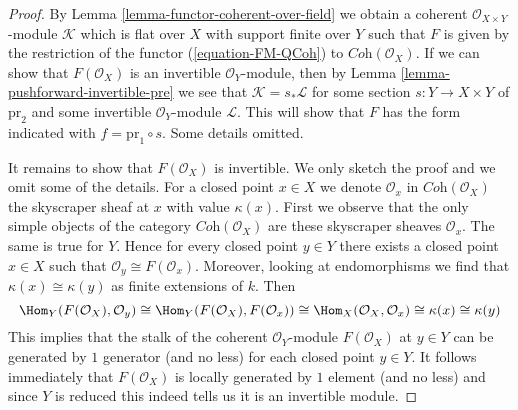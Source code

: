 \begin{proof}
By Lemma \ref{lemma-functor-coherent-over-field} we obtain a coherent
$\mathcal{O}_{X \times Y}$-module $\mathcal{K}$ which is flat
over $X$ with support finite over $Y$ such that $F$ is given by
the restriction of the functor
(\ref{equation-FM-QCoh}) to $\textit{Coh}(\mathcal{O}_X)$.
If we can show that $F(\mathcal{O}_X)$ is an invertible $\mathcal{O}_Y$-module,
then by Lemma \ref{lemma-pushforward-invertible-pre}
we see that $\mathcal{K} = s_*\mathcal{L}$
for some section $s : Y \to X \times Y$ of $\text{pr}_2$ and some
invertible $\mathcal{O}_Y$-module $\mathcal{L}$.
This will show that $F$ has the form indicated with
$f = \text{pr}_1 \circ s$. Some details omitted.

\medskip\noindent
It remains to show that $F(\mathcal{O}_X)$ is invertible. We only
sketch the proof and we omit some of the details.
For a closed point $x \in X$ we denote
$\mathcal{O}_x$ in $\textit{Coh}(\mathcal{O}_X)$
the skyscraper sheaf at $x$ with value $\kappa(x)$.
First we observe that the only simple objects
of the category $\textit{Coh}(\mathcal{O}_X)$
are these skyscraper sheaves $\mathcal{O}_x$.
The same is true for $Y$. Hence for every closed point $y \in Y$
there exists a closed point $x \in X$ such that
$\mathcal{O}_y \cong F(\mathcal{O}_x)$. Moreover, looking at endomorphisms
we find that $\kappa(x) \cong \kappa(y)$ as finite extensions of $k$.
Then
$$
\Hom_Y(F(\mathcal{O}_X), \mathcal{O}_y) \cong
\Hom_Y(F(\mathcal{O}_X), F(\mathcal{O}_x)) \cong
\Hom_X(\mathcal{O}_X, \mathcal{O}_x) \cong \kappa(x) \cong \kappa(y)
$$
This implies that the stalk of the coherent $\mathcal{O}_Y$-module
$F(\mathcal{O}_X)$ at $y \in Y$ can be generated by $1$ generator
(and no less) for each closed point $y \in Y$. It follows immediately
that $F(\mathcal{O}_X)$ is locally generated by $1$ element (and no less)
and since $Y$ is reduced this indeed tells us it is an invertible module.
\end{proof}
















